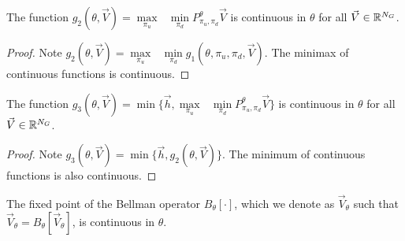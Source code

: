 \documentclass[letterpaper, 10 pt, conference]{ieeeconf}
\begin{document}
\begin{lemma}
The function $g_2(\theta,\vec{V})= \underset{\pi_u}{\max}\text{ }\underset{ \pi_d}{\min} P^{\theta}_{\pi_u, \pi_d} \vec{V}$ is continuous in $\theta$ for all $\vec{V}\in \mathbb{R}^{N_G}$.
\end{lemma}

\begin{proof}
Note $g_2(\theta,\vec{V})=\underset{\pi_u}{\max}\text{ }\underset{ \pi_d}{\min}g_1(\theta,\pi_u,\pi_d,\vec{V})$. The minimax of continuous functions is continuous. 
\end{proof}


\begin{lemma}
The function $g_3(\theta,\vec{V})= \min\{\vec{h}, \underset{\pi_u}{\max}\text{ }\underset{ \pi_d}{\min} P^{\theta}_{\pi_u, \pi_d} \vec{V}\}$ is continuous in $\theta$ for all $\vec{V}\in \mathbb{R}^{N_G}$.
\end{lemma}

\begin{proof}
Note $g_3(\theta,\vec{V})= \min\{\vec{h}, g_2(\theta,\vec{V})\}$. The minimum of continuous functions is also continuous. 
\end{proof}

\begin{proposition}
The fixed point of the Bellman operator $B_{\theta}[\cdot]$, which we denote as $\vec{V}_{\theta}$ such that $\vec{V}_{\theta}=B_{\theta}[\vec{V}_{\theta}]$, is continuous in $\theta$.
\end{proposition}
\end{document}
